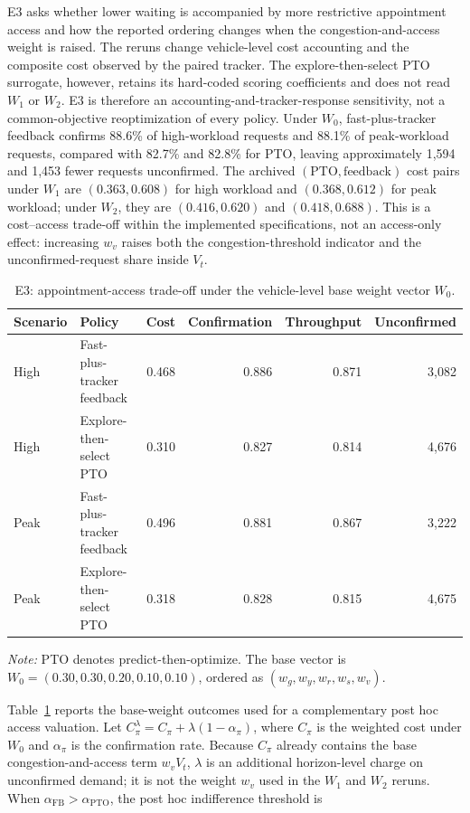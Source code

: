 \documentclass[preprint,12pt,authoryear,a4paper]{elsarticle}
\begin{document}
E3 asks whether lower waiting is accompanied by more restrictive appointment access and how the reported ordering changes when the congestion-and-access weight is raised. The reruns change vehicle-level cost accounting and the composite cost observed by the paired tracker. The explore-then-select PTO surrogate, however, retains its hard-coded scoring coefficients and does not read \(W_1\) or \(W_2\). E3 is therefore an accounting-and-tracker-response sensitivity, not a common-objective reoptimization of every policy. Under \(W_0\), fast-plus-tracker feedback confirms 88.6\% of high-workload requests and 88.1\% of peak-workload requests, compared with 82.7\% and 82.8\% for PTO, leaving approximately 1,594 and 1,453 fewer requests unconfirmed. The archived \((\text{PTO},\text{feedback})\) cost pairs under \(W_1\) are \((0.363,0.608)\) for high workload and \((0.368,0.612)\) for peak workload; under \(W_2\), they are \((0.416,0.620)\) and \((0.418,0.688)\). This is a cost--access trade-off within the implemented specifications, not an access-only effect: increasing \(w_v\) raises both the congestion-threshold indicator and the unconfirmed-request share inside \(V_t\).

\begin{table}[htbp]
\centering
\caption{E3: appointment-access trade-off under the vehicle-level base weight vector \(W_0\).}
\label{tab:e3-service-tradeoff}
\scriptsize
\setlength{\tabcolsep}{2pt}
\begin{tabular*}{\textwidth}{@{\extracolsep{\fill}}llrrrr@{}}
\toprule
Scenario & Policy & Cost & Confirmation & Throughput & Unconfirmed \\
\midrule
High & Fast-plus-tracker feedback & 0.468 & 0.886 & 0.871 & 3,082 \\
High & Explore-then-select PTO & 0.310 & 0.827 & 0.814 & 4,676 \\
Peak & Fast-plus-tracker feedback & 0.496 & 0.881 & 0.867 & 3,222 \\
Peak & Explore-then-select PTO & 0.318 & 0.828 & 0.815 & 4,675 \\
\bottomrule
\end{tabular*}
\begin{minipage}{\textwidth}
\footnotesize\raggedright
\textit{Note:} PTO denotes predict-then-optimize. The base vector is \(W_0=(0.30,0.30,0.20,0.10,0.10)\), ordered as \((w_g,w_y,w_r,w_s,w_v)\).
\end{minipage}
\end{table}

Table~\ref{tab:e3-service-tradeoff} reports the base-weight outcomes used for a complementary post hoc access valuation. Let \(C_\pi^\lambda=C_\pi+\lambda(1-\alpha_\pi)\), where \(C_\pi\) is the weighted cost under \(W_0\) and \(\alpha_\pi\) is the confirmation rate. Because \(C_\pi\) already contains the base congestion-and-access term \(w_vV_t\), \(\lambda\) is an additional horizon-level charge on unconfirmed demand; it is not the weight \(w_v\) used in the \(W_1\) and \(W_2\) reruns. When \(\alpha_{\mathrm{FB}}>\alpha_{\mathrm{PTO}}\), the post hoc indifference threshold is
\end{document}
